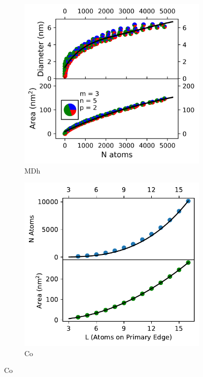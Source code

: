\begin{figure}
\begin{subfigure}[b]{0.425\textwidth}
    \includegraphics[width=\textwidth]{figures/Theory/MDh_Size_lin.png}
    \caption{MDh}
    \label{Fig:NPs_MDh}
    \end{subfigure}
\begin{subfigure}[b]{0.425\textwidth}
    \includegraphics[width=\textwidth]{figures/Theory/Co_Sizes.pdf}
    \caption{Co}
    \label{Fig:NPs_Co}

\end{subfigure}
\end{figure}
